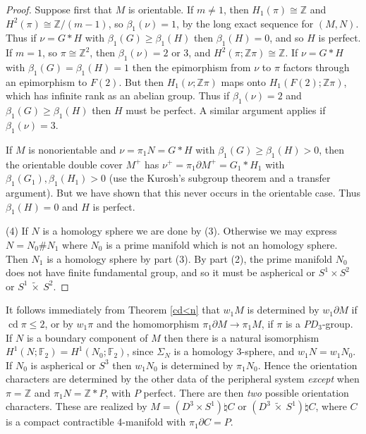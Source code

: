 \documentclass[12pt]{amsart}
\renewcommand{\geq}{\geqslant}
\renewcommand{\leq}{\leqslant}
\theoremstyle{definition}
\newcommand{\Z}{\mathbb Z}
\DeclareMathOperator{\cd}{cd}
\begin{document}
\begin{proof}
Suppose first that $M$ is orientable.
If $m\not=1$, then $H_1(\pi)\cong \Z$ and $H^2(\pi)\cong\mathbb{Z}/(m-1)$,
so $\beta_1(\nu)=1$, by the long exact sequence for $(M,N)$.
Thus if $\nu = {G}*{H}$ with $\beta_1(G)\geq\beta_1(H)$ then $\beta_1(H)=0$, and so $H$ is perfect.
If $m=1$, so $\pi\cong\mathbb{Z}^2$, then $\beta_1(\nu)=2$ or 3,
and $H^2(\pi;\Z\pi)\cong\mathbb{Z}$.
If $\nu = {G}*{H}$ with $\beta_1(G)=\beta_1(H)=1$ then the epimorphism from $\nu$ to $\pi$ factors through an epimorphism to $F(2)$.
But then $H_1(\nu;\Z\pi)$ maps onto $H_1(F(2);\Z\pi)$,
which has infinite rank as an abelian group.
Thus if $\beta_1(\nu)=2$ and $\beta_1(G)\geq\beta_1(H)$ then 
$H$ must be perfect.
A similar argument applies if $\beta_1(\nu)=3$.

If $M$ is nonorientable and $\nu=\pi_1N = {G*H}$ 
with $\beta_1(G)\geq \beta_1(H)>0$, then the orientable double cover $M^+$
has $\nu^+=\pi_1\partial{M^+} = {G_1*H_1}$ with $\beta_1(G_1),\beta_1(H_1)>0$ (use the Kurosh's subgroup theorem and a transfer argument).
But we have shown that this never occurs in the orientable case.   Thus $\beta_1(H) = 0$ and $H$ is perfect.

(4) If $N$ is a homology sphere we are done by (3).   Otherwise 
we may express $N = N_0 \# N_1$ where $N_0$ is a prime manifold which is not an homology sphere.    Then $N_1$ is a homology sphere by part (3).
By part (2), the prime manifold $N_0$ does not have finite fundamental group, 
and so it must be aspherical or $S^1 \times S^2$ or  $S^1~ \tilde \times ~S^2$.
\end{proof}


It follows immediately from Theorem \ref{cd<n} that $w_1M$ is determined by $w_1\partial{M}$ if $\cd\pi\leq2$, or by $w_1\pi$ and the homomorphism
$\pi_1\partial{M}\to\pi_1M$,  if $\pi$ is a $PD_3$-group.
If $N$ is a boundary component of $M$ then there is a natural isomorphism 
$H^1(N;\mathbb{F}_2)=H^1(N_0;\mathbb{F}_2)$, 
since $\Sigma_N$ is a homology 3-sphere,
and $w_1N=w_1N_0$.
If $N_0$ is aspherical or $S^3$ then $w_1N_0$ is determined by 
$\pi_1N_0$.
Hence the orientation characters are determined by the other data of the peripheral system {\it except\/} when $\pi=\mathbb{Z}$ and 
$\pi_1N=\mathbb{Z}*P$, with $P$ perfect.
There are then {\it two\/} possible orientation characters.
These are realized by $M=(D^3\times{S^1})\natural{C}$ or
 $(D^3~\tilde\times~{S^1})\natural{C}$, where $C$ is a compact contractible 4-manifold with $\pi_1\partial{C}=P$.
 
\end{document}
